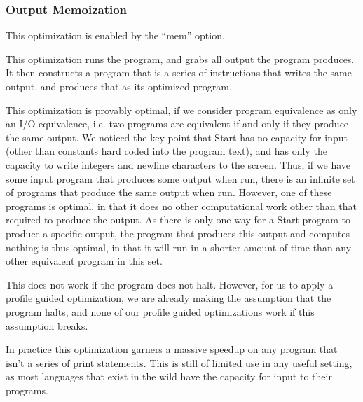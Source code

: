 \documentclass[12pt,letterpaper]{article}
\begin{document}
\subsubsection*{Output Memoization}

This optimization is enabled by the ``mem'' option.

This optimization runs the program, and grabs all output the program
produces. It then constructs a program that is a series of
instructions that writes the same output, and produces that as its
optimized program.

This optimization is provably optimal, if we consider program
equivalence as only an I/O equivalence, i.e. two programs are
equivalent if and only if they produce the same output. We noticed the
key point that Start has no capacity for input (other than constants
hard coded into the program text), and has only the capacity to write
integers and newline characters to the screen. Thus, if we have some
input program that produces some output when run, there is an infinite
set of programs that produce the same output when run. However, one of
these programs is optimal, in that it does no other computational work
other than that required to produce the output. As there is only one
way for a Start program to produce a specific output, the program that
produces this output and computes nothing is thus optimal, in that it
will run in a shorter amount of time than any other equivalent program
in this set.

This does not work if the program does not halt. However, for us to
apply a profile guided optimization, we are already making the
assumption that the program halts, and none of our profile guided
optimizations work if this assumption breaks.

In practice this optimization garners a massive speedup on any program
that isn't a series of print statements. This is still of limited use
in any useful setting, as most languages that exist in the wild have
the capacity for input to their programs.
\end{document}
